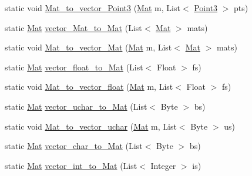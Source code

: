 \begin{DoxyCompactItemize}
\item 
static void \mbox{\hyperlink{classorg_1_1opencv_1_1utils_1_1_converters_a7f6b9e1b650ad8a0302058ba3e98ccbf}{Mat\+\_\+to\+\_\+vector\+\_\+\+Point3}} (\mbox{\hyperlink{classorg_1_1opencv_1_1core_1_1_mat}{Mat}} m, List$<$ \mbox{\hyperlink{classorg_1_1opencv_1_1core_1_1_point3}{Point3}} $>$ pts)
\item 
static \mbox{\hyperlink{classorg_1_1opencv_1_1core_1_1_mat}{Mat}} \mbox{\hyperlink{classorg_1_1opencv_1_1utils_1_1_converters_a52674f43499f6f1e12c0568545f818c7}{vector\+\_\+\+Mat\+\_\+to\+\_\+\+Mat}} (List$<$ \mbox{\hyperlink{classorg_1_1opencv_1_1core_1_1_mat}{Mat}} $>$ mats)
\item 
static void \mbox{\hyperlink{classorg_1_1opencv_1_1utils_1_1_converters_a7d234e9dfd3ab6dd4b135a504c7aa659}{Mat\+\_\+to\+\_\+vector\+\_\+\+Mat}} (\mbox{\hyperlink{classorg_1_1opencv_1_1core_1_1_mat}{Mat}} m, List$<$ \mbox{\hyperlink{classorg_1_1opencv_1_1core_1_1_mat}{Mat}} $>$ mats)
\item 
static \mbox{\hyperlink{classorg_1_1opencv_1_1core_1_1_mat}{Mat}} \mbox{\hyperlink{classorg_1_1opencv_1_1utils_1_1_converters_a91e9e08babc67886df39271c9903c632}{vector\+\_\+float\+\_\+to\+\_\+\+Mat}} (List$<$ Float $>$ fs)
\item 
static void \mbox{\hyperlink{classorg_1_1opencv_1_1utils_1_1_converters_a560f50731e834601f907fddd2b706bbb}{Mat\+\_\+to\+\_\+vector\+\_\+float}} (\mbox{\hyperlink{classorg_1_1opencv_1_1core_1_1_mat}{Mat}} m, List$<$ Float $>$ fs)
\item 
static \mbox{\hyperlink{classorg_1_1opencv_1_1core_1_1_mat}{Mat}} \mbox{\hyperlink{classorg_1_1opencv_1_1utils_1_1_converters_af59a2cd4a167a7ab1eb0d13ddb51ca26}{vector\+\_\+uchar\+\_\+to\+\_\+\+Mat}} (List$<$ Byte $>$ bs)
\item 
static void \mbox{\hyperlink{classorg_1_1opencv_1_1utils_1_1_converters_a982d75b2c3a6e72125fa6a806390156d}{Mat\+\_\+to\+\_\+vector\+\_\+uchar}} (\mbox{\hyperlink{classorg_1_1opencv_1_1core_1_1_mat}{Mat}} m, List$<$ Byte $>$ us)
\item 
static \mbox{\hyperlink{classorg_1_1opencv_1_1core_1_1_mat}{Mat}} \mbox{\hyperlink{classorg_1_1opencv_1_1utils_1_1_converters_a5c2a285fbffbef78c4849ac0a18158fd}{vector\+\_\+char\+\_\+to\+\_\+\+Mat}} (List$<$ Byte $>$ bs)
\item 
static \mbox{\hyperlink{classorg_1_1opencv_1_1core_1_1_mat}{Mat}} \mbox{\hyperlink{classorg_1_1opencv_1_1utils_1_1_converters_ae4554b9fe86f13758d83c05d270bc566}{vector\+\_\+int\+\_\+to\+\_\+\+Mat}} (List$<$ Integer $>$ is)

\end{DoxyCompactItemize}

